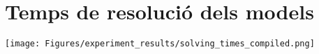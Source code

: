 

\chapter{Temps de resolució dels models} %

\label{AppendixD}

\begin{sidewaysfigure}
    \centering
    \texttt{[image: Figures/experiment\_results/solving\_times\_compiled.png]}
\end{sidewaysfigure}
